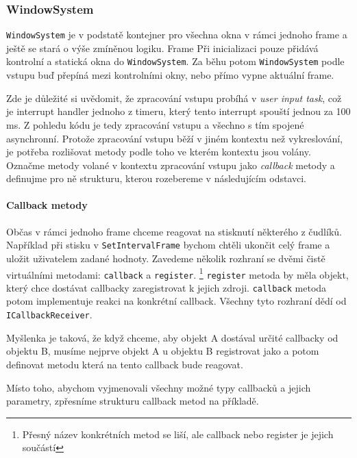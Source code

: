 \subsubsection{WindowSystem}
\texttt{WindowSystem} je v podstatě kontejner pro všechna okna v rámci jednoho frame a ještě se stará
o výše zmíněnou logiku.
Frame Při inicializaci pouze přidává kontrolní a statická okna do \texttt{WindowSystem}.
Za běhu potom \texttt{WindowSystem} podle vstupu buď přepíná mezi kontrolními okny, nebo přímo vypne
aktuální frame.

Zde je důležité si uvědomit, že zpracování vstupu probíhá v \emph{user input task}, což je interrupt
handler jednoho z timeru, který tento interrupt spouští jednou za 100 ms.
Z pohledu kódu je tedy zpracování vstupu a všechno s tím spojené asynchronní.
Protože zpracování vstupu běží v jiném kontextu než vykreslování, je potřeba rozlišovat metody podle
toho ve kterém kontextu jsou volány.
Označme metody volané v kontextu zpracování vstupu jako \emph{callback} metody a definujme pro
ně strukturu, kterou rozebereme v následujícím odstavci.

\paragraph{Callback metody}
Občas v rámci jednoho frame chceme reagovat na stisknutí některého z čudlíků.
Například při stisku  v \texttt{SetIntervalFrame} bychom chtěli ukončit celý frame a uložit
uživatelem zadané hodnoty.
Zavedeme několik rozhraní se dvěmi čistě virtuálními metodami: \texttt{callback} a \texttt{register}.
\footnote{Přesný název konkrétních metod se liší, ale callback nebo register je jejich součástí}
\texttt{register} metoda by měla objekt, který chce dostávat callbacky zaregistrovat k jejich zdroji.
\texttt{callback} metoda potom implementuje reakci na konkrétní callback.
Všechny tyto rozhraní dědí od \texttt{ICallbackReceiver}.

Myšlenka je taková, že když chceme, aby objekt A dostával určité callbacky od objektu B,
musíme nejprve objekt A u objektu B registrovat jako  a potom definovat
metodu která na tento callback bude reagovat.

Místo toho, abychom vyjmenovali všechny možné typy callbacků a jejich parametry, zpřesníme
strukturu callback metod na příkladě.


